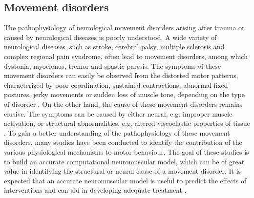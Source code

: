

\subsection*{Movement disorders}

The pathophysiology of neurological movement disorders arising after trauma or caused by neurological diseases is poorly understood. A wide variety of neurological diseases, such as stroke, cerebral palsy, multiple sclerosis and complex regional pain syndrome, often lead to movement disorders, among which dystonia, myoclonus, tremor and spastic paresis. The symptoms of these movement disorders can easily be observed from the distorted motor patterns, characterized by poor coordination, sustained contractions, abnormal fixed postures, jerky movements or sudden loss of muscle tone, depending on the type of disorder \cite{levy_myoclonus_2016, de_gooijer-van_de_groep_differentiation_2013, munts_fixed_2011}. On the other hand, the cause of these movement disorders remains elusive. The symptoms can be caused by either neural, e.g. improper muscle activation, or structural abnormalities, e.g. altered viscoelastic properties of tissue \cite{de_gooijer-van_de_groep_differentiation_2013}. To gain a better understanding of the pathophysiology of these movement disorders, many studies have been conducted to identify the contribution of the various physiological mechanisms to motor behaviour. The goal of these studies is to build an accurate computational neuromuscular model, which can be of great value in identifying the structural or neural cause of a movement disorder. It is expected that an accurate neuromuscular model is useful to predict the effects of interventions and can aid in developing adequate treatment \cite{meskers_neurocontrol_2015}.


